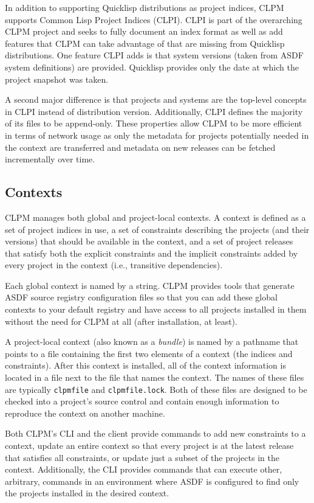 \documentclass[sigconf]{acmart}
\begin{document}
In addition to supporting Quicklisp distributions as project indices, CLPM
supports Common Lisp Project Indices (CLPI). CLPI is part of the overarching
CLPM project and seeks to fully document an index format as well as add
features that CLPM can take advantage of that are missing from Quicklisp
distributions. One feature CLPI adds is that system versions (taken from ASDF
system definitions) are provided. Quicklisp provides only the date at which the
project snapshot was taken.

A second major difference is that projects and systems are the top-level
concepts in CLPI instead of distribution version. Additionally, CLPI defines
the majority of its files to be append-only. These properties allow CLPM to be
more efficient in terms of network usage as only the metadata for projects
potentially needed in the context are transferred and metadata on new releases
can be fetched incrementally over time.

\subsection{Contexts}

CLPM manages both global and project-local contexts. A context is defined as a
set of project indices in use, a set of constraints describing the projects
(and their versions) that should be available in the context, and a set of
project releases that satisfy both the explicit constraints and the implicit
constraints added by every project in the context (i.e., transitive
dependencies).

Each global context is named by a string. CLPM provides tools that generate
ASDF source registry configuration files so that you can add these global
contexts to your default registry and have access to all projects installed in
them without the need for CLPM at all (after installation, at least).

A project-local context (also known as a {\it bundle}) is named by a pathname
that points to a file containing the first two elements of a context (the
indices and constraints). After this context is installed, all of the context
information is located in a file next to the file that names the context. The
names of these files are typically {\tt clpmfile} and {\tt clpmfile.lock}. Both
of these files are designed to be checked into a project's source control and
contain enough information to reproduce the context on another machine.

Both CLPM's CLI and the client provide commands to add new constraints to a
context, update an entire context so that every project is at the latest
release that satisfies all constraints, or update just a subset of the projects
in the context. Additionally, the CLI provides commands that can execute other,
arbitrary, commands in an environment where ASDF is configured to find only the
projects installed in the desired context.
\end{document}
